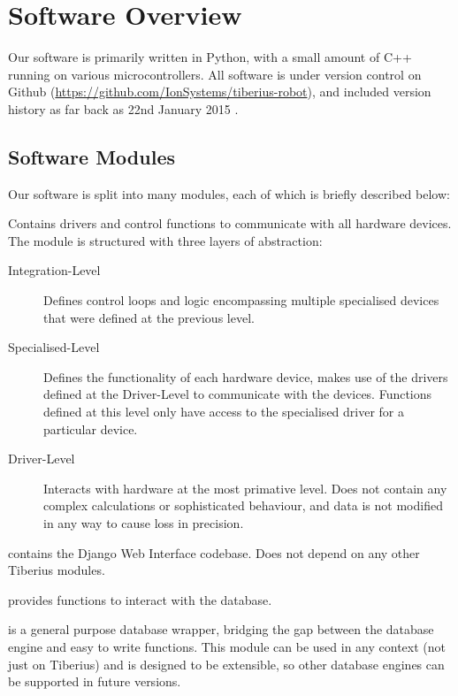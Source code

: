 \section{Software Overview}

Our software is primarily written in Python, with a small amount of C++ running on various microcontrollers.
All software is under version control on Github (\url{https://github.com/IonSystems/tiberius-robot}), and included version history as far back as 22nd January 2015 \cite{oldest-commit}.

\subsection{Software Modules}
Our software is split into many modules, each of which is briefly described below:
\begin{description}[align=left]
\item [Control] Contains drivers and control functions to communicate with all hardware devices. The module is structured with three layers of abstraction:
\begin{description}
\item [Integration-Level] Defines control loops and logic encompassing multiple specialised devices that were defined at the previous level.

\item [Specialised-Level] Defines the functionality of each hardware device, makes use of the drivers defined at the Driver-Level to communicate with the devices. Functions defined at this level only have access to the specialised driver for a particular device. 

\item [Driver-Level] Interacts with hardware at the most primative level. Does not contain any complex calculations or sophisticated behaviour, and data is not modified in any way to cause loss in precision.
\end{description}

\item [Web Interface] contains the Django Web Interface codebase. Does not depend on any other Tiberius modules.

\item [Database] provides functions to interact with the database.

\item [Database Wrapper] is a general purpose database wrapper, bridging the gap between the database engine and easy to write functions. This module can be used in any context (not just on Tiberius) and is designed to be extensible, so other database engines can be supported in future versions.


\end{description}
